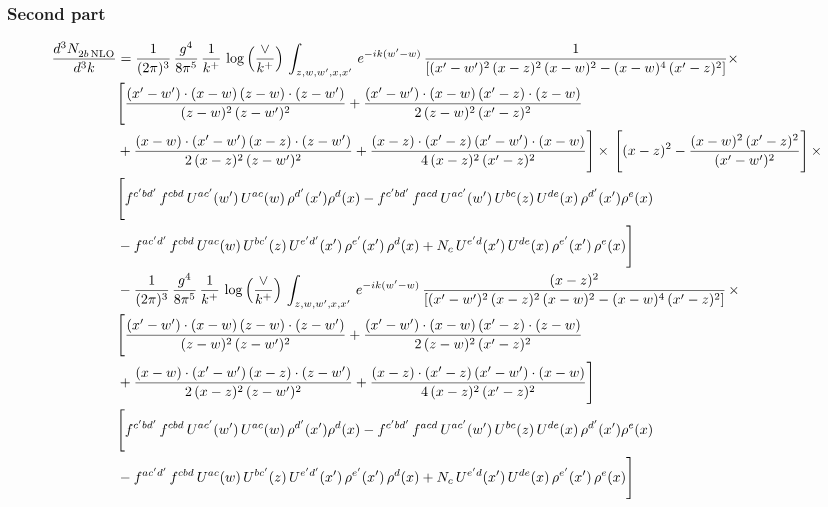 \documentclass[9pt]{article}
\numberwithin{equation}{section}
\begin{document}
\subsubsection{Second part}
\begin{align}
    \frac{d^{3}N_{2b\,\rm NLO}^{\rm}}{d^{3}k}  & =  \frac{1}{(2\pi)^{3}}\, \frac{g^{4}}{8\pi^{5}}\,\frac{1}{k^{+}}\,\log{\left(\frac{\vee}{k^{+}}\right)}\,\int_{z,w,w^{\prime},x,x'}\, e^{-ik(w^{\prime}-w)}\, \frac{1}{\left[(x'-w')^{2}\,(x-z)^{2}\,(x-w)^{2} - (x-w)^{4}\, (x'-z)^{2}\right]} \times\notag \\ & \Bigg[\frac{(x'-w')\cdot (x-w)\, (z-w)\cdot (z-w')}{(z-w)^{2}\, (z-w')^{2}}+\frac{(x'-w')\cdot (x-w)\, (x'-z)\cdot (z-w)}{2\, (z-w)^{2}\, (x'-z)^{2}}\notag \\ & +\frac{(x-w)\cdot (x'-w')\, (x-z)\cdot (z-w')}{2\, (x-z)^{2}\, (z-w')^{2}}+\frac{(x-z)\cdot (x'-z)\, (x'-w')\cdot (x-w)}{4\, (x-z)^{2}\, (x'-z)^{2}}\Bigg] \times\,\Bigg[(x-z)^{2} - \frac{(x-w)^{2}\, (x'-z)^{2}}{(x'-w')^{2}}\Bigg]\,\times \notag \\ & \Bigg[f^{c'bd'}\,f^{cbd}\, U^{ac'}(w')\,U^{ac}(w)\,\rho^{d'}(x')\rho^{d}(x)- f^{c'bd'}\,f^{acd}\,U^{ac'}(w')\,U^{bc}(z)\,U^{de}(x)\,\rho^{d'}(x')\rho^{e}(x) \notag \\ & -f^{ac'd'}\,f^{cbd}\,U^{ac}(w)\,U^{bc'}(z)\,U^{e'd'}(x')\,\rho^{e'}(x')\,\rho^{d}(x) +N_{c}\,U^{e'd}(x')\,U^{de}(x)\,\rho^{e'}(x')\,\rho^{e}(x)\Bigg] \notag \\
&  - \frac{1}{(2\pi)^{3}}\, \frac{g^{4}}{8\pi^{5}}\,\frac{1}{k^{+}}\,\log{\left(\frac{\vee}{k^{+}}\right)}\,\int_{z,w,w^{\prime},x,x'}\, e^{-ik(w^{\prime}-w)}\, \frac{(x-z)^{2}}{\left[(x'-w')^{2}\,(x-z)^{2}\,(x-w)^{2} - (x-w)^{4}\, (x'-z)^{2}\right]}\,  \times\notag \\ & \Bigg[\frac{(x'-w')\cdot (x-w)\, (z-w)\cdot (z-w')}{(z-w)^{2}\, (z-w')^{2}}+\frac{(x'-w')\cdot (x-w)\, (x'-z)\cdot (z-w)}{2\, (z-w)^{2}\, (x'-z)^{2}}\notag \\ & +\frac{(x-w)\cdot (x'-w')\, (x-z)\cdot (z-w')}{2\, (x-z)^{2}\, (z-w')^{2}}+\frac{(x-z)\cdot (x'-z)\, (x'-w')\cdot (x-w)}{4\, (x-z)^{2}\, (x'-z)^{2}}\Bigg] \notag \\ & \Bigg[f^{c'bd'}\,f^{cbd}\, U^{ac'}(w')\,U^{ac}(w)\,\rho^{d'}(x')\rho^{d}(x)- f^{c'bd'}\,f^{acd}\,U^{ac'}(w')\,U^{bc}(z)\,U^{de}(x)\,\rho^{d'}(x')\rho^{e}(x) \notag \\ & -f^{ac'd'}\,f^{cbd}\,U^{ac}(w)\,U^{bc'}(z)\,U^{e'd'}(x')\,\rho^{e'}(x')\,\rho^{d}(x) +N_{c}\,U^{e'd}(x')\,U^{de}(x)\,\rho^{e'}(x')\,\rho^{e}(x)\Bigg] \notag \\

\end{align}
\end{document}

